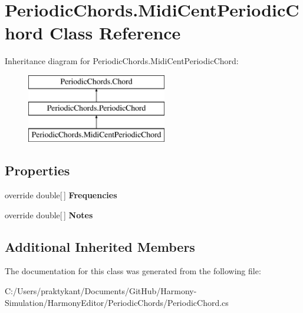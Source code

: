 \hypertarget{class_periodic_chords_1_1_midi_cent_periodic_chord}{\section{Periodic\+Chords.\+Midi\+Cent\+Periodic\+Chord Class Reference}
\label{class_periodic_chords_1_1_midi_cent_periodic_chord}
}
Inheritance diagram for Periodic\+Chords.\+Midi\+Cent\+Periodic\+Chord\+:\begin{figure}[H]
\begin{center}
\leavevmode
\includegraphics[height=3.000000cm]{class_periodic_chords_1_1_midi_cent_periodic_chord}
\end{center}
\end{figure}
\subsection*{Properties}
\begin{DoxyCompactItemize}
\item 
\hypertarget{class_periodic_chords_1_1_midi_cent_periodic_chord_a53fb6447477b22579280d5ded1b2daf2}{override double\mbox{[}$\,$\mbox{]} {\bfseries Frequencies}}\label{class_periodic_chords_1_1_midi_cent_periodic_chord_a53fb6447477b22579280d5ded1b2daf2}

\item 
\hypertarget{class_periodic_chords_1_1_midi_cent_periodic_chord_acd8d30256b212e5e8048a147554f34b3}{override double\mbox{[}$\,$\mbox{]} {\bfseries Notes}}\label{class_periodic_chords_1_1_midi_cent_periodic_chord_acd8d30256b212e5e8048a147554f34b3}

\end{DoxyCompactItemize}
\subsection*{Additional Inherited Members}


The documentation for this class was generated from the following file\+:\begin{DoxyCompactItemize}
\item 
C\+:/\+Users/praktykant/\+Documents/\+Git\+Hub/\+Harmony-\/\+Simulation/\+Harmony\+Editor/\+Periodic\+Chords/Periodic\+Chord.\+cs\end{DoxyCompactItemize}
